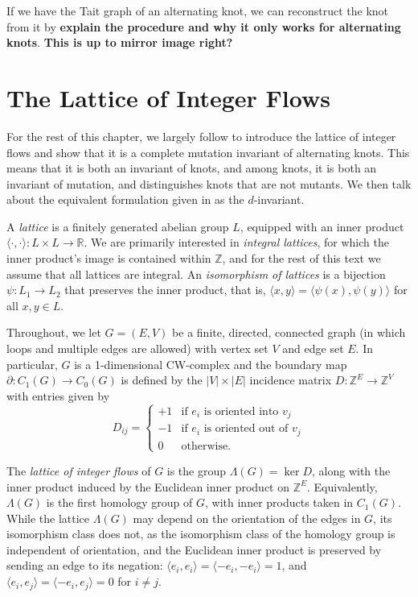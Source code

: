 \documentclass[12pt]{report}
\newcommand{\R}{\mathbb{R}}
\newcommand{\Z}{\mathbb{Z}}
\newcommand{\ip}[2]{\langle #1, #2 \rangle}
\newcommand{\notered}[1]{{\color{Red} \textbf{#1}}}
\newcommand{\notegreen}[1]{{\color{Green} \textbf{#1}}}
\begin{document}
If we have the Tait graph of an alternating knot, we can reconstruct the knot from it by \notegreen{explain the procedure and why it only works for alternating knots}. \notered{This is up to mirror image right?}


\section{The Lattice of Integer Flows}

For the rest of this chapter, we largely follow \cite{lattices-graphs-mutation} to introduce the lattice of integer flows and show that it is a complete mutation invariant of alternating knots. This means that it is both an invariant of knots, and among knots, it is both an invariant of mutation, and distinguishes knots that are not mutants. We then talk about the equivalent formulation given in \cite{lattices-graphs-mutation} as the $d$-invariant.

A \textit{lattice} is a finitely generated abelian group $L$, equipped with an inner product 
\({\ip{\cdot}{\cdot}: L \times L \longrightarrow \R}\). We are primarily interested in \textit{integral lattices}, for which the inner product's image is contained within $\Z$, and for the rest of this text we assume that all lattices are integral. An \textit{isomorphism of lattices} is a bijection $\psi: L_{1} \longrightarrow L_{2}$ that preserves the inner product, that is, ${\ip{x}{y} = \ip{\psi(x)}{\psi(y)}}$ for all $x, y \in L$.

Throughout, we let $G = (E, V)$ be a finite, directed, connected graph (in which loops and multiple edges are allowed) with vertex set $V$ and edge set $E$. In particular, $G$ is a 1-dimensional CW-complex and the boundary map $\partial:  C_{1}(G) \longrightarrow C_{0}(G)$ is defined by the $|V|\times|E|$ incidence matrix $D : \Z^{E} \longrightarrow \Z^{V}$ with entries given by
\[D_{ij} = \begin{cases}
	+1 & \text{if $e_{i}$ is oriented into $v_{j}$}   \\
	-1 & \text{if $e_{i}$ is oriented out of $v_{j}$} \\
	0  & \text{otherwise.}
\end{cases}\]

The \textit{lattice of integer flows} of $G$ is the group $\Lambda(G) = \ker D$, along with the inner product induced by the Euclidean inner product on $\Z^{E}$. Equivalently, $\Lambda(G)$ is the first homology group of $G$, with inner products taken in $C_{1}(G)$. While the lattice $\Lambda(G)$ may depend on the orientation of the edges in $G$, its isomorphism class does not, as the isomorphism class of the homology group is independent of orientation, and the Euclidean inner product is preserved by sending an edge to its negation: $\ip{e_{i}}{e_{i}} =  \ip{-e_{i}}{-e_{i}} = 1$, and $\ip{e_{i}}{e_{j}} = \ip{-e_{i}}{e_{j}} = 0$ for $i \neq j$.
\end{document}
